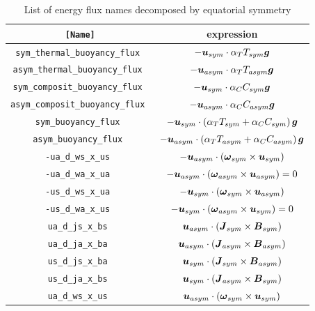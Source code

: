 %
%
\begin{table}[htp]
\caption{List of energy flux names decomposed by equatorial symmetry}
\begin{center}
\begin{tabular}{|c|c|}
\hline
{\tt [Name]} & expression  \\ \hline
\tt sym\_thermal\_buoyancy\_flux &  $ - \mbox{\boldmath$u$}_{sym}  \cdot  \alpha_{T} T_{sym} \mbox{\boldmath$g$}  $ \\
\tt asym\_thermal\_buoyancy\_flux  &  $ - \mbox{\boldmath$u$}_{asym}  \cdot  \alpha_{T} T_{asym} \mbox{\boldmath$g$}  $ \\
\tt sym\_composit\_buoyancy\_flux &  $ - \mbox{\boldmath$u$}_{sym}  \cdot  \alpha_{C} C_{sym} \mbox{\boldmath$g$}  $ \\
\tt asym\_composit\_buoyancy\_flux  &  $ - \mbox{\boldmath$u$}_{asym}  \cdot  \alpha_{C} C_{asym} \mbox{\boldmath$g$}  $ \\
\tt sym\_buoyancy\_flux &  $ - \mbox{\boldmath$u$}_{sym}  \cdot  \left(\alpha_{T} T_{sym} + \alpha_{C} C_{sym} \right)\mbox{\boldmath$g$}  $ \\
\tt asym\_buoyancy\_flux  &  $ - \mbox{\boldmath$u$}_{asym}  \cdot  \left(\alpha_{T} T_{asym} + \alpha_{C} C_{asym} \right)\mbox{\boldmath$g$}  $ \\
 \hline \hline
%
\tt -ua\_d\_ws\_x\_us &  $ -\mbox{\boldmath$u$}_{asym} \cdot \left( \mbox{\boldmath$\omega$}_{sym} \times \mbox{\boldmath$u$}_{sym} \right)$ \\
\tt -ua\_d\_wa\_x\_ua  &  $ -\mbox{\boldmath$u$}_{asym} \cdot  \left( \mbox{\boldmath$\omega$}_{asym} \times \mbox{\boldmath$u$}_{asym} \right) = 0$ \\
\tt -us\_d\_ws\_x\_ua  &  $ -\mbox{\boldmath$u$}_{sym} \cdot  \left( \mbox{\boldmath$\omega$}_{sym} \times \mbox{\boldmath$u$}_{asym} \right)$ \\
\tt -us\_d\_wa\_x\_us &  $ -\mbox{\boldmath$u$}_{sym} \cdot  \left( \mbox{\boldmath$\omega$}_{asym} \times \mbox{\boldmath$u$}_{sym} \right) = 0$ \\ \hline
%
\tt ua\_d\_js\_x\_bs  &  $ \mbox{\boldmath$u$}_{asym} \cdot \left(\mbox{\boldmath$J$}_{sym} \times \mbox{\boldmath$B$}_{sym} \right) $ \\
\tt ua\_d\_ja\_x\_ba  &  $ \mbox{\boldmath$u$}_{asym}  \cdot  \left(\mbox{\boldmath$J$}_{asym} \times \mbox{\boldmath$B$}_{asym} \right) $ \\
\tt us\_d\_js\_x\_ba  &  $ \mbox{\boldmath$u$}_{sym}  \cdot  \left(\mbox{\boldmath$J$}_{sym} \times \mbox{\boldmath$B$}_{asym} \right) $ \\
\tt us\_d\_ja\_x\_bs  &  $ \mbox{\boldmath$u$}_{sym}  \cdot  \left(\mbox{\boldmath$J$}_{asym} \times \mbox{\boldmath$B$}_{sym} \right) $ \\ \hline \hline
%
\tt  ua\_d\_ws\_x\_us &  $   \mbox{\boldmath$u$}_{asym} \cdot \left( \mbox{\boldmath$\omega$}_{sym} \times \mbox{\boldmath$u$}_{sym} \right)$ \\

\end{tabular}
\end{center}
\end{table}
